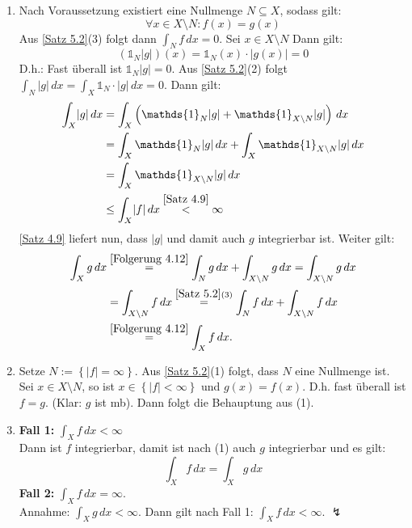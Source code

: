 \documentclass[a4paper,twoside,DIV15,BCOR12mm,chapterprefix=true,headings=onelinechapter]{scrbook}
\begin{document}
\begin{beweis}
\begin{enumerate}
\item Nach Voraussetzung existiert eine Nullmenge $N\subseteq X$, sodass gilt:
\[\forall x\in X\setminus N:f(x)=g(x)\] 
Aus \ref{Satz 5.2}(3) folgt dann $\int_N f\,dx=0$.
Sei $x\in X\setminus N$ Dann gilt: 
\[\left( \mathds{1}_N \lvert g \rvert \right)(x)=\mathds{1}_N(x)\cdot \lvert g(x) \rvert=0\] 
D.h.: Fast überall ist $\mathds{1}_N \lvert g \rvert =0$. Aus \ref{Satz 5.2}(2) folgt $\int_N \lvert g \rvert\,dx=\int_X\mathds{1}_N\cdot \lvert g \rvert\,dx=0$.
Dann gilt:
\begin{align*}
\int_X \lvert g\rvert\,dx & = \int_X \left(\mathds{1}_N \lvert g\rvert + \mathds{1}_{X\setminus N} \lvert g\rvert \right)\,dx\\ 
 &= \int_X\mathds{1}_N \lvert g\rvert\,dx + \int _X\mathds{1}_{X\setminus N} \lvert g\rvert\,dx\\
 &= \int_X \mathds{1}_{X\setminus N} \lvert g \rvert\,dx\\
& \leq\int_X \lvert f\rvert\,dx \overset{\ref{Satz 4.9}}< \infty
\end{align*}
\ref{Satz 4.9} liefert nun, dass $\lvert g\rvert$ und damit auch $g$ integrierbar ist. Weiter gilt:
\begin{align*}
\int_Xg\,dx &\overset{\ref{Folgerung 4.12}} = \int_N g\,dx+ \int_{X\setminus N}g\,dx = \int_{X\setminus N}g\,dx\\
&= \int_{X\setminus N}f\,dx \overset{\ref{Satz 5.2}(3)}= \int_N f\,dx +\int_{X\setminus N}f\,dx\\
&\overset{\ref{Folgerung 4.12}}= \int_X f\,dx.
\end{align*}

\item Setze $N:=\left\{\lvert f\rvert =\infty \right\}$. Aus \ref{Satz 5.2}(1) folgt, dass $N$ eine Nullmenge ist. Sei $x\in X\setminus N$, so ist $x\in \left\{\lvert f\rvert <\infty \right\}$ und $g(x)=f(x)$.
D.h. fast überall ist $f=g$. (Klar: $g$ ist mb). Dann folgt die Behauptung aus (1).
\item \textbf{Fall 1:} $\int_Xf\,dx<\infty$\\
Dann ist $f$ integrierbar, damit ist nach (1) auch $g$ integrierbar und es gilt:
\[\int_Xf\,dx=\int_Xg\,dx\]
\textbf{Fall 2:} $\int_Xf\,dx=\infty$.\\
Annahme: $\int_Xg\,dx<\infty$. Dann gilt nach Fall 1: $\int_Xf\,dx<\infty$. $\lightning$
\end{enumerate}
\end{beweis}
\end{document}
